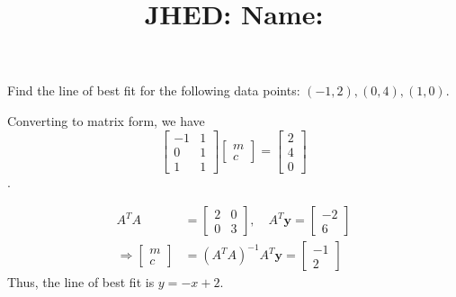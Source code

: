 \documentclass[reqno, answers]{exam}
\title{\normalsize{
  JHED: \underline{\hspace{4cm}} \hspace{1em} Name: \underline{\hspace{9cm}}}
   }
\author{}
\date{}
\begin{document}
\maketitle
\vspace{-2cm} %

\begin{questions}

\question 
Find the line of best fit for the following data points: $(-1, 2), (0, 4), (1, 0)$.
\begin{solution}
Converting to matrix form, we have
\[\begin{bmatrix}
-1 & 1 \\
0 & 1 \\
1 & 1
\end{bmatrix}
\begin{bmatrix}m \\ c
\end{bmatrix} =
\begin{bmatrix}2 \\ 4 \\ 0
\end{bmatrix}\].

\begin{align*}
  A^T A &= \begin{bmatrix}2 & 0 \\ 0 & 3
\end{bmatrix}, \quad
A^T \mathbf{y} = \begin{bmatrix}-2 \\ 6
\end{bmatrix} \\
\Rightarrow \begin{bmatrix}m \\ c
\end{bmatrix} &= (A^T A)^{-1} A^T \mathbf{y} = \begin{bmatrix}-1 \\ 2  \end{bmatrix}
\end{align*}
Thus, the line of best fit is $y = -x + 2$.
\end{solution}

\newpage
\question
{}
\end{questions}
\end{document}
